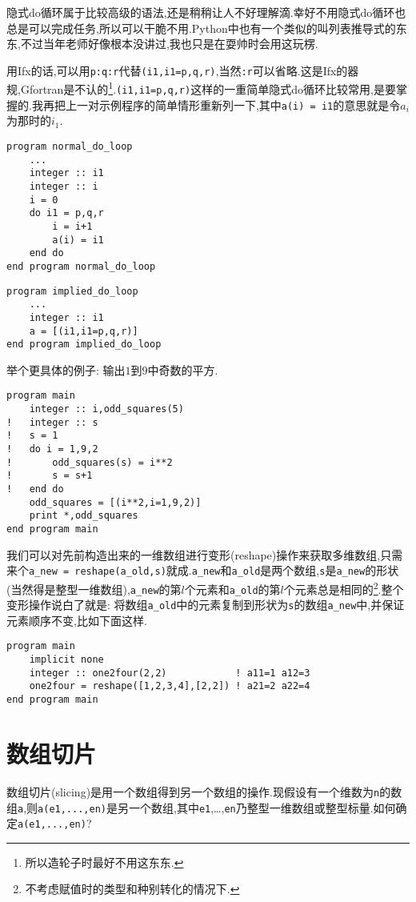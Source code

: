 隐式do循环属于比较高级的语法,还是稍稍让人不好理解滴.幸好不用隐式do循环也总是可以完成任务,所以可以干脆不用.Python中也有一个类似的叫列表推导式的东东,不过当年老师好像根本没讲过,我也只是在耍帅时会用这玩楞.

用Ifx的话,可以用\texttt{p:q:r}代替\texttt{(i1,i1=p,q,r)},当然\texttt{:r}可以省略.这是Ifx的器规,Gfortran是不认的\footnote{
所以造轮子时最好不用这东东.
}.\texttt{(i1,i1=p,q,r)}这样的一重简单隐式do循环比较常用,是要掌握的.我再把上一对示例程序的简单情形重新列一下,其中\texttt{a(i) = i1}的意思就是令$a_i$为那时的$i_1$.
\begin{lstlisting}
program normal_do_loop
    ...
    integer :: i1
    integer :: i
    i = 0
    do i1 = p,q,r
        i = i+1
        a(i) = i1
    end do
end program normal_do_loop
\end{lstlisting}
\begin{lstlisting}
program implied_do_loop
    ...
    integer :: i1
    a = [(i1,i1=p,q,r)]
end program implied_do_loop
\end{lstlisting}
举个更具体的例子: 输出$1$到$9$中奇数的平方.
\begin{lstlisting}
program main
    integer :: i,odd_squares(5)
!   integer :: s
!   s = 1
!   do i = 1,9,2
!       odd_squares(s) = i**2
!       s = s+1
!   end do
    odd_squares = [(i**2,i=1,9,2)]
    print *,odd_squares
end program main
\end{lstlisting}

我们可以对先前构造出来的一维数组进行变形(reshape)操作来获取多维数组,只需来个\texttt{a\_{}new = reshape(a\_{}old,s)}就成.\texttt{a\_{}new}和\texttt{a\_{}old}是两个数组,\texttt{s}是\texttt{a\_{}new}的形状(当然得是整型一维数组),\texttt{a\_{}new}的第$l$个元素和\texttt{a\_{}old}的第$l$个元素总是相同的\footnote{
不考虑赋值时的类型和种别转化的情况下.
}.整个变形操作说白了就是: 将数组\texttt{a\_{}old}中的元素复制到形状为\texttt{s}的数组\texttt{a\_{}new}中,并保证元素顺序不变,比如下面这样.
\begin{lstlisting}
program main
    implicit none
    integer :: one2four(2,2)            ! a11=1 a12=3
    one2four = reshape([1,2,3,4],[2,2]) ! a21=2 a22=4
end program main
\end{lstlisting}

\section{数组切片}

数组切片(slicing)是用一个数组得到另一个数组的操作.现假设有一个维数为\texttt{n}的数组\texttt{a},则\texttt{a(e1,...,en)}是另一个数组,其中\texttt{e1},\dots,\texttt{en}乃整型一维数组或整型标量.如何确定\texttt{a(e1,...,en)}?

